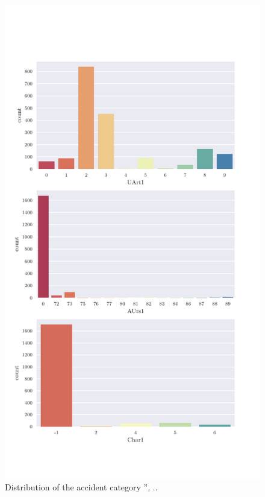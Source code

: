 \documentclass[a4paper,headsepline,footsepline,fontsize=11pt,BCOR=12mm,DIV=12]{report}
\begin{document}
\begin{appendices}
\begin{figure}[h]
	\centering
	\includegraphics[scale=0.7]{../CorrAnalysis/data/BAYSIS/02_matched/plots/baysis_matched_count_multiple03}
	\caption{Distribution of the accident category '', ..}
	\label{img:appendix_baysis_matched_03}
\end{figure}


\end{appendices}
\end{document}
